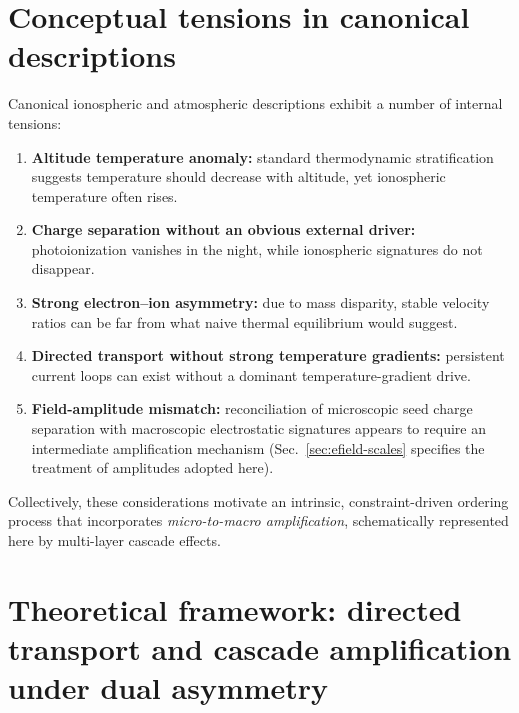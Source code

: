 \documentclass[11pt,a4paper]{article}
\begin{document}
\section{Conceptual tensions in canonical descriptions}
Canonical ionospheric and atmospheric descriptions exhibit a number of internal tensions:
\begin{enumerate}
  \item \textbf{Altitude temperature anomaly:} standard thermodynamic stratification suggests temperature should decrease with altitude, yet ionospheric temperature often rises.
  \item \textbf{Charge separation without an obvious external driver:} photoionization vanishes in the night, while ionospheric signatures do not disappear.
  \item \textbf{Strong electron--ion asymmetry:} due to mass disparity, stable velocity ratios can be far from what naive thermal equilibrium would suggest.
  \item \textbf{Directed transport without strong temperature gradients:} persistent current loops can exist without a dominant temperature-gradient drive.
  \item \textbf{Field-amplitude mismatch:} reconciliation of microscopic seed charge separation with macroscopic electrostatic signatures appears to require an intermediate amplification mechanism (Sec.~\ref{sec:efield-scales} specifies the treatment of amplitudes adopted here).
 \end{enumerate}
Collectively, these considerations motivate an intrinsic, constraint-driven ordering process that incorporates \emph{micro-to-macro amplification}, schematically represented here by multi-layer cascade effects.

\section{Theoretical framework: directed transport and cascade amplification under dual asymmetry}
\end{document}
